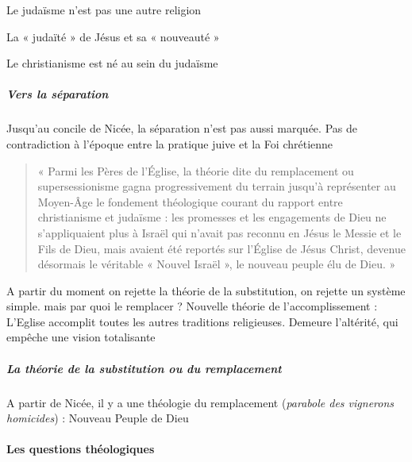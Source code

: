     
      
      Le judaïsme n'est pas une autre religion
      
    
      
      La « judaïté » de Jésus et sa « nouveauté »
      
    
      
      Le christianisme est né au sein du judaïsme
      
    
      
    \subparagraph{Vers la séparation}  Jusqu'au concile de Nicée, la séparation n'est pas aussi marquée. Pas de contradiction à l'époque entre la pratique juive et la Foi chrétienne 
      \begin{quote}
    «  Parmi  les  Pères  de  l’Église,  la  théorie  dite  du  remplacement  ou  supersessionisme  gagna progressivement  du  terrain  jusqu’à  représenter  au  Moyen-Âge  le  fondement  théologique courant  du  rapport  entre  christianisme  et  judaïsme  :  les  promesses  et  les  engagements  de  Dieu ne  s’appliquaient  plus  à  Israël  qui  n’avait  pas  reconnu  en  Jésus  le  Messie  et  le  Fils  de  Dieu, mais  avaient  été  reportés  sur  l’Église  de  Jésus  Christ,  devenue  désormais  le  véritable  « Nouvel  Israël  », le  nouveau peuple  élu de  Dieu.  »    
\end{quote}
\begin{Synthesis}
    A partir du moment on rejette la théorie de la substitution, on rejette un système simple. mais par quoi le remplacer ?
    Nouvelle théorie de l'accomplissement : L'Eglise accomplit toutes les autres traditions religieuses. Demeure l'altérité, qui empêche une vision totalisante
\end{Synthesis}
    
      
       \subparagraph{La théorie de la substitution ou du remplacement} A partir de Nicée, il y a une théologie du remplacement (\textit{parabole des vignerons homicides}) : Nouveau Peuple de Dieu
      
    
  
    
    \paragraph{Les questions théologiques}
    

   
    
      
   
